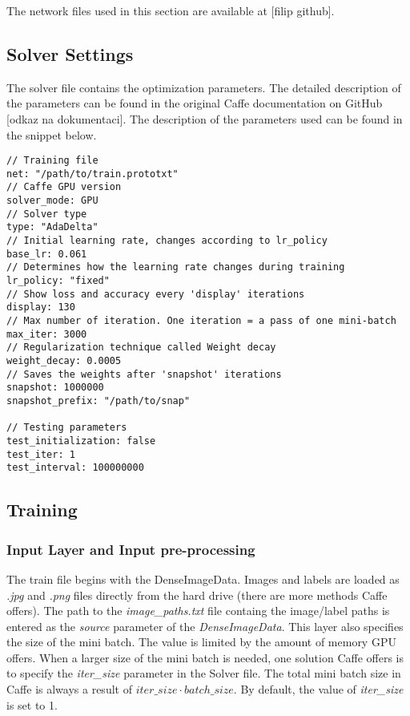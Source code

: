 The network files used in this section are available at [filip github].

\subsection{Solver Settings}

The solver file contains the optimization parameters. The detailed description of the parameters can be found in the original Caffe documentation on GitHub [odkaz na dokumentaci]. The description of the parameters used can be found in the snippet below. 

\begin{lstlisting}
// Training file
net: "/path/to/train.prototxt"	
// Caffe GPU version
solver_mode: GPU
// Solver type		
type: "AdaDelta"
// Initial learning rate, changes according to lr_policy		
base_lr: 0.061		
// Determines how the learning rate changes during training
lr_policy: "fixed"	
// Show loss and accuracy every 'display' iterations
display: 130
// Max number of iteration. One iteration = a pass of one mini-batch			
max_iter: 3000	
// Regularization technique called Weight decay		
weight_decay: 0.0005
// Saves the weights after 'snapshot' iterations
snapshot: 1000000		
snapshot_prefix: "/path/to/snap" 

// Testing parameters
test_initialization: false	
test_iter: 1
test_interval: 100000000
\end{lstlisting}

\subsection{Training}

\subsubsection{Input Layer and Input pre-processing}

The train file begins with the DenseImageData. Images and labels are loaded as \textit{.jpg} and \textit{.png} files directly from the hard drive (there are more methods Caffe offers). The path to the \textit{image\_paths.txt} file containg the image/label paths is entered as the \textit{source} parameter of the \textit{DenseImageData}. This layer also specifies the size of the mini batch. The value is limited by the amount of memory GPU offers. When a larger size of the mini batch is needed, one solution Caffe offers is to specify the \textit{iter\_size} parameter in the Solver file. The total mini batch size in Caffe is always a result of $iter\_size \cdot batch\_size$. By default, the value of \textit{iter\_size} is set to 1.

